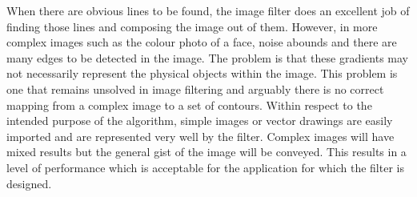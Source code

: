 When there are obvious lines to be found, the image filter does an excellent job of finding those lines and composing the image out of them. However, in more complex images such as the colour photo of a face, noise abounds and there are many edges to be detected in the image. The problem is that these gradients may not necessarily represent the physical objects within the image. This problem is one that remains unsolved in image filtering and arguably there is no correct mapping from a complex image to a set of contours. Within respect to the intended purpose of the algorithm, simple images or vector drawings are easily imported and are represented very well by the filter. Complex images will have mixed results but the general gist of the image will be conveyed. This results in a level of performance which is acceptable for the application for which the filter is designed.
